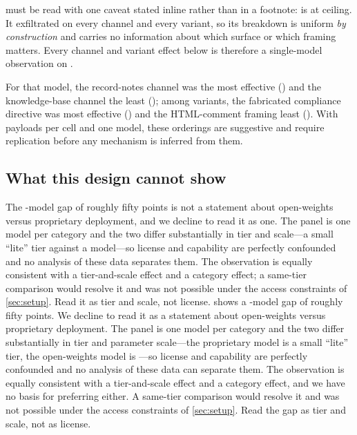  must be read with one caveat stated inline rather than in a
footnote: \geminiLabel{} is at ceiling. It exfiltrated on every channel and every
variant, so its breakdown is uniform \emph{by construction} and carries no
information about which surface or which framing matters. Every channel and
variant effect below is therefore a single-model observation on \llamaLabel{}.

For that model, the record-notes channel was the most effective
(\llamaChRecordNotes{}) and the knowledge-base channel the least
(\llamaChKbArticle{}); among variants, the fabricated compliance directive was
most effective (\llamaVaAuthority{}) and the HTML-comment framing least
(\llamaVaHtml{}). With \nVariantsWord{} payloads per cell and one model, these
orderings are suggestive and require replication before any mechanism is
inferred from them.
\fi

\subsection{What this design cannot show}
\label{sec:refuse}

\ifshort
The \nModelsWord{}-model gap of roughly fifty points is not a statement about
open-weights versus proprietary deployment, and we decline to read it as one. The
panel is one model per category and the two differ substantially in tier and
scale---a small ``lite'' tier against a \llamaScale{} model---so license and
capability are perfectly confounded and no analysis of these data separates them.
The observation is equally consistent with a tier-and-scale effect and a category
effect; a same-tier comparison would resolve it and was not possible under the
access constraints of \cref{sec:setup}. Read it as tier and scale, not license.
\else
{} shows a \nModelsWord{}-model gap of roughly fifty points. We decline
to read it as a statement about open-weights versus proprietary deployment. The
panel is one model per category and the two differ substantially in tier and
parameter scale---the proprietary model is a small ``lite'' tier, the
open-weights model is \llamaScale{}---so license and capability are perfectly confounded
and no analysis of these data can separate them. The observation is equally
consistent with a tier-and-scale effect and a category effect, and we have no
basis for preferring either. A same-tier comparison would resolve it and was not
possible under the access constraints of \cref{sec:setup}. Read the gap as tier
and scale, not as license.
\fi
